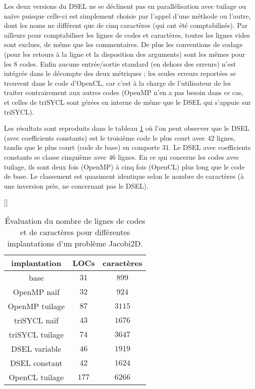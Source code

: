 Les deux versions du DSEL ne se déclinent pas en parallélisation avec tuilage ou naïve puisque celle-ci est simplement choisie par l'appel d'une méthode ou l'autre, dont les noms ne différent que de cinq caractères (qui ont été comptabilisés). Par ailleurs pour comptabiliser les lignes de codes et caractères, toutes les lignes vides sont exclues, de même que les commentaires. De plus les conventions de codage (pour les retours à la ligne et la disposition des arguments) sont les mêmes pour les $8$ codes. Enfin aucune entrée/sortie standard (en dehors des erreurs) n'est intégrée dans le décompte des deux métriques ; les seules erreurs reportées se trouvent dans le code d'\textsf{OpenCL}, car c'est à la charge de l'utilisateur de les traiter contrairement aux autres codes (\textsf{OpenMP} n'en a pas besoin dans ce cas, et celles de \textsf{triSYCL} sont gérées en interne de même que le DSEL qui s'appuie sur \textsf{triSYCL}).

Les résultats sont reproduits dans le tableau \ref{tab:eval_qual} où l'on peut observer que le DSEL (avec coefficients constants) est le troisième code le plus court avec $42$ lignes, tandis que le plus court (code de base) en comporte $31$. Le DSEL avec coefficients constants se classe cinquième avec $46$ lignes. En ce qui concerne les codes avec tuilage, ils sont deux fois (\textsf{OpenMP}) à cinq fois (\textsf{OpenCL}) plus long que le code de base. Le classement est quasiment identique selon le nombre de caractères (à une inversion près, ne concernant pas le DSEL).

\begin{table}
[\FBwidth]
{
\caption{Évaluation du nombre de lignes de codes et de caractères pour différentes implantations d'un problème Jacobi2D.}
\label{tab:eval_qual}
}
{
\begin{tabular}{||c||c|c||}
\hline
implantation & LOCs & caractères \\
\hline
\hline
base & $31$ & $899$ \\
\hline
OpenMP naïf & $32$ & $924$ \\
\hline
OpenMP tuilage & $87$ & $3115$ \\
\hline
triSYCL naïf & $43$ & $1676$ \\
\hline
triSYCL tuilage & $74$ & $3647$ \\
\hline
DSEL variable & $46$ & $1919$ \\
\hline
DSEL constant & $42$ & $1624$ \\
\hline
OpenCL tuilage & $177$ & $6266$ \\
\hline
\end{tabular}
}
\end{table}


